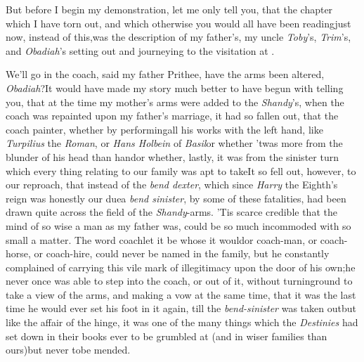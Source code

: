 \documentclass{article}
\begin{document}
But before I begin my demonstration, let me only tell you,
that the chapter which I have torn out, and which otherwise
you would all have been reading\break just now, instead of
this,\tsk was the description of my father’s, my uncle
\textit{Toby}’s, \textit{Trim}’s, and \textit{Obadiah}’s
setting out and journeying to the visitation at
\lower-4pt\hbox{\astiv}.

We’ll go in the coach, said my father\break
\tsk Prithee, have the arms been altered,
\textit{Obadiah}?\tsk It would have made my story much
better to have begun with telling you, that at the time my
mother’s arms were added to the \textit{Shandy}’s, when the
coach was repainted upon my father’s marriage, it had so
fallen out, that the coach painter, whether by performing\pb all
his works with the left hand, like\break
\textit{Turpilius} the
\textit{Roman}, or \textit{Hans Holbein} of
\textit{Basil}\tsk or whether ’twas more from the blunder of
his head than hand\tsk or whe\-ther, lastly, it was from the
sinister turn which every thing relating to our family was
apt to take\tsk It so fell out, however, to our reproach,
that instead of the \textit{bend dexter}, which since
\textit{Harry} the Eighth’s reign was honestly our due\tsk a
\textit{bend sinister}, by some of these fatalities, had
been drawn quite across the field of the \textit{Shandy}-arms. 
’Tis scarce credible that the mind of so wise a man as
my father was, could be so much incommoded with so small a
matter. The word coach\tsk let it be whose it would\tsk or
coach-man, or coach-horse, or coach-hire, could never be
named in the family, but he constantly complained of
carrying this vile mark of illegitimacy upon the door of his
own;\pb he never once was able to step into the coach, or out
of it, without turning\break round to take a view of the arms, and
making a vow at the same time, that it was the last time he
would ever set his foot in it again, till the
\textit{bend-sinister} was taken out\tsk but like the affair
of the hinge, it was one of the many things which the
\textit{Destinies} had set down in their books ever to be
grumbled at (and in wiser families than ours)\tsk but never
to\break be mended.
\end{document}
